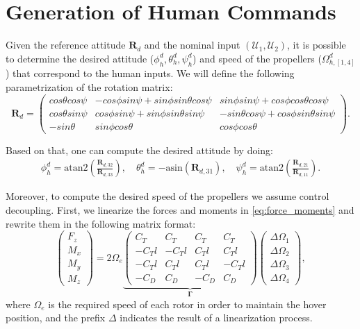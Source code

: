 \section{Generation of Human Commands}\label{ap:human_commands}
Given the reference attitude $\mathbf{R}_d$ and the nominal input $(\mathcal{U}_1,\mathcal{U}_2)$, it is possible to determine the desired attitude ($\phi^d_h,\theta^d_h, \psi^d_h$) and speed of the propellers ($\Omega^d_{h,[1,4]}$) that correspond to the human inputs. We will define the following parametrization of the rotation matrix:
\begin{equation*}
	\mathbf{R}_d = \begin{pmatrix} cos\theta cos\psi & -cos\phi sin\psi + sin\phi sin\theta cos\psi & sin\phi sin\psi + cos\phi cos\theta cos\psi \\
	cos\theta sin\psi & cos\phi sin\psi + sin\phi sin\theta sin\psi & -sin\theta cos\psi + cos\phi sin\theta sin\psi \\
	-sin\theta & sin\phi cos\theta & cos\phi cos\theta	
	\end{pmatrix}.
\end{equation*}

Based on that, one can compute the desired attitude by doing:
\begin{equation*}
\begin{aligned}
	\phi^d_h = \text{atan2}\left( \frac{\mathbf{R}_{d,32}}{\mathbf{R}_{d,33}} \right), \quad \theta^d_h = -\text{asin}\left ( \mathbf{R}_{d,31} \right ), \quad \psi^d_h = \text{atan2}\left( \frac{\mathbf{R}_{d,21}}{\mathbf{R}_{d,11}} \right).
\end{aligned}
\end{equation*}

Moreover, to compute the desired speed of the propellers we assume control decoupling. First, we linearize the forces and moments in \eqref{eq:force_moments} and rewrite them in the following matrix format:
\begin{equation}
	\begin{pmatrix}F_z \\M_x \\M_y \\M_z \end{pmatrix} = 2\Omega_e\underbrace{\begin{pmatrix} C_T & C_T & C_T & C_T \\
	-C_Tl & -C_Tl & C_Tl & C_Tl \\
	-C_Tl & C_Tl & C_Tl & -C_Tl \\
	-C_D & C_D & -C_D & C_D
	\end{pmatrix}}_{\mathbf{\Gamma}}
	\begin{pmatrix}\Delta \Omega_1\\ \Delta \Omega_2\\ \Delta \Omega_3\\ \Delta \Omega_4\end{pmatrix},\label{eq:gamma}%
\end{equation}
where $\Omega_e$ is the required speed of each rotor in order to maintain the hover position, and the prefix $\Delta$ indicates the result of a linearization process.

